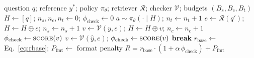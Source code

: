 \documentclass[11pt]{article}
\begin{document}
\begin{algorithm}[h]
\small
\caption{Checker-Guided Rollout with Auto-Check}
\label{alg:rollout}
\begin{algorithmic}[1]
\Require question $q$; reference $y^{*}$; policy $\pi_\theta$; retriever $\mathcal{R}$; checker $\mathcal{V}$; budgets $(B_s, B_c, B_t)$
\State $H \gets [q]$; $n_s, n_c, n_t \gets 0$; $\phi_{\text{check}} \gets 0$
  \State $a \sim \pi_\theta(\cdot \mid H)$; $n_t \gets n_t + 1$
    \State $e \gets \mathcal{R}(q')$; $H \gets H \oplus e$; $n_s \gets n_s + 1$
    \State $v \gets \mathcal{V}(y, e)$; $H \gets H \oplus v$; $n_c \gets n_c + 1$
    \State $\phi_{\text{check}} \gets \textsc{score}(v)$ 
     
      \State $v \gets \mathcal{V}(\hat{y}, e)$; $\phi_{\text{check}} \gets \textsc{score}(v)$
    \EndIf
    \State \textbf{break}
  \EndIf
\EndWhile
\State $r_{\text{base}} \gets$ Eq.~\ref{eq:rbase}; \quad
$P_{\text{fmt}} \gets$ format penalty
\State \Return $R = r_{\text{base}}\cdot(1+\alpha\,\phi_{\text{check}}) + P_{\text{fmt}}$
\end{algorithmic}
\end{algorithm}
\end{document}
